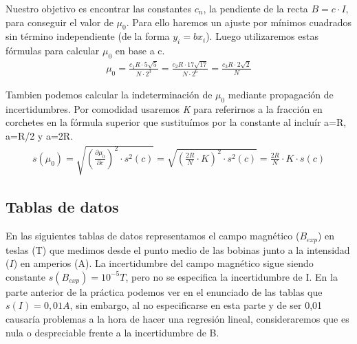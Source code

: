 \documentclass[12pt, a4paper, titlepage]{article}
\begin{document}
  Nuestro objetivo es encontrar las constantes $c_n$, la pendiente de la recta $B = c \cdot I$, para conseguir el valor de $\mu_0$. Para ello haremos un ajuste por mínimos cuadrados sin término independiente (de la forma $y_i = bx_i$). Luego utilizaremos estas fórmulas para calcular $\mu_0$ en base a c.
  \begin{gather}
    \mu_0 = \frac{c_1 R \cdot 5 \sqrt{5}}{N \cdot 2^3} = \frac{c_2 R \cdot 17 \sqrt{17}}{N \cdot 2^6} = \frac{c_3 R \cdot 2 \sqrt{2}}{N} \label{ec:mu}
  \end{gather}

  Tambien podemos calcular la indeterminación de $\mu_0$ mediante propagación de incertidumbres. Por comodidad usaremos \textit{K} para referirnos a la fracción en corchetes en la fórmula superior que sustituímos por la constante al incluír a=R, a=R/2 y a=2R.
  \begin{gather}
    s(\mu_0) = \sqrt{\left(\frac{\partial \mu_0}{\partial c} \right)^2 \cdot s^2(c)} = \sqrt{\left( \frac{2R}{N} \cdot K \right)^2 \cdot s^2(c)} = \frac{2R}{N} \cdot K \cdot s(c) \label{ec:smu}
  \end{gather}

  \newpage
  \subsection{Tablas de datos}

  En las siguientes tablas de datos representamos el campo magnético ($B_{exp}$) en teslas (T) que medimos desde el punto medio de las bobinas junto a la intensidad ($I$) en amperios (A). La incertidumbre del campo magnético sigue siendo constante $s(B_{exp}) = 10^{-5}T$, pero no se especifica la incertidumbre de I. En la parte anterior de la práctica podemos ver en el enunciado de las tablas que $s(I) = 0,01A$, sin embargo, al no especificarse en esta parte y de ser 0,01 causaría problemas a la hora de hacer una regresión lineal, consideraremos que es nula o despreciable frente a la incertidumbre de B.
\end{document}
